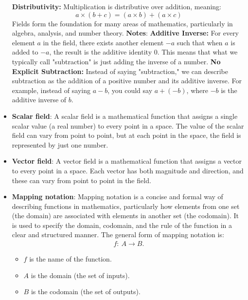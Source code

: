 \documentclass{report}
\begin{document}
\begin{itemize}
\begin{itemize}
            \end{itemize}
            \textbf{Distributivity:} Multiplication is distributive over addition, meaning:
            \[
                a \times (b + c) = (a \times b) + (a \times c)
            \]
            Fields form the foundation for many areas of mathematics, particularly in algebra, analysis, and number theory.
            \bigbreak \noindent 
            \textbf{Notes}:
            \textbf{Additive Inverse:} For every element \(a\) in the field, there exists another element \(-a\) such that when \(a\) is added to \(-a\), the result is the additive identity \(0\). This means that what we typically call "subtraction" is just adding the inverse of a number.
            \bigbreak \noindent 
            \textbf{No Explicit Subtraction:} Instead of saying "subtraction," we can describe subtraction as the addition of a positive number and its additive inverse. For example, instead of saying \(a - b\), you could say \(a + (-b)\), where \(-b\) is the additive inverse of \(b\).
        \item \textbf{Scalar field}: A scalar field is a mathematical function that assigns a single scalar value (a real number) to every point in a space. The value of the scalar field can vary from point to point, but at each point in the space, the field is represented by just one number.
        \item \textbf{Vector field}: A vector field is a mathematical function that assigns a vector to every point in a space. Each vector has both magnitude and direction, and these can vary from point to point in the field.
        \item \textbf{Mapping notation}: Mapping notation is a concise and formal way of describing functions in mathematics, particularly how elements from one set (the domain) are associated with elements in another set (the codomain). It is used to specify the domain, codomain, and the rule of the function in a clear and structured manner.
            \bigbreak \noindent 
            The general form of mapping notation is:
            \begin{align*}
                f:\ A \to B
            .\end{align*}
            \begin{itemize}
                \item $f$ is the name of the function.
                \item $A$ is the domain (the set of inputs).
                \item $B$ is the codomain (the set of outputs).

\end{itemize}
\end{itemize}
\end{document}
